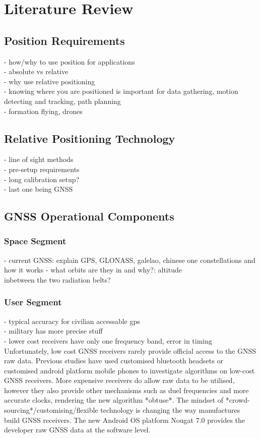 
\def\chapdir{./ChapterLiteratureReview}

\chapter{Literature Review} \label{ch:litreview}



\section{Position Requirements}
- how/why to use position for applications\\
- absolute vs relative\\
- why use relative positioning\\
- knowing where you are positioned is important for data gathering, motion detecting and tracking, path planning\\
- formation flying, drones\\
\section{Relative Positioning Technology}
- line of sight methods\\
- pre-setup requirements\\
- long calibration setup?\\


- last one being GNSS
\section{GNSS Operational Components}
\subsection{Space Segment}
- current GNSS: explain GPS, GLONASS, galelao, chinese one constellations and how it works
- what orbits are they in and why?: altitude\\
inbetween the two radiation belts?
\subsection{User Segment}
- typical accuracy for civilian accessable gps\\
- military has more precise stuff\\
- lower cost receivers have only one frequency band, error in timing\\
Unfortunately, low cost GNSS receivers rarely provide official access to the GNSS raw data. Previous studies have used customised bluetooth headsets or customised android platform mobile phones to investigate algorithms on low-cost GNSS receivers. More expensive receivers do allow raw data to be utilised, however they also provide other mechanisms such as duel frequencies and more accurate clocks, rendering the new algorithm *obtuse*. The mindset of *crowd-sourcing*/customising/flexible technology is changing the way manufactures build GNSS receivers. The new Android OS platform Nougat 7.0 provides the developer raw GNSS data at the software level.  

